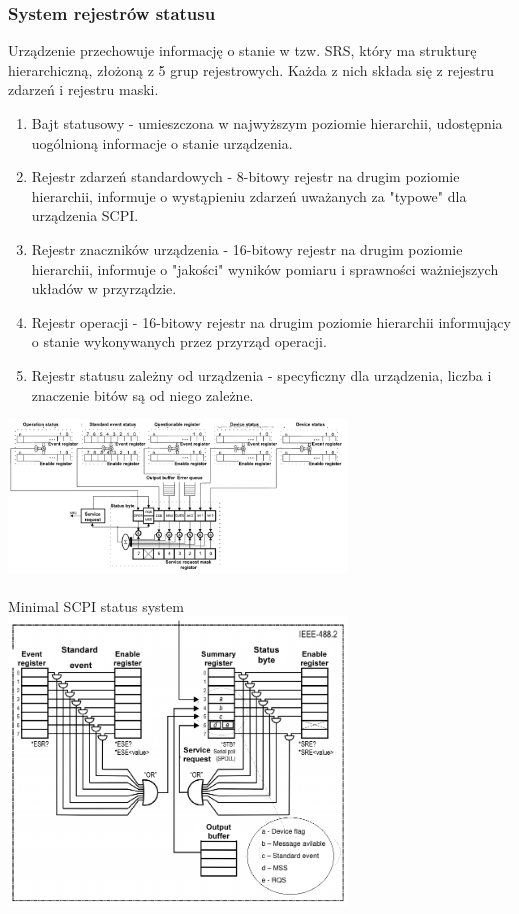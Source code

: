 \subsubsection{System rejestrów statusu}
Urządzenie przechowuje informację o stanie w tzw. SRS, który ma strukturę hierarchiczną, złożoną z 5 grup rejestrowych. Każda z nich składa się z rejestru zdarzeń i rejestru maski.
\begin{enumerate}
	\item Bajt statusowy - umieszczona w najwyższym poziomie hierarchii, udostępnia uogólnioną informacje o stanie urządzenia.
	\item Rejestr zdarzeń standardowych - 8-bitowy rejestr na drugim poziomie hierarchii, informuje o wystąpieniu zdarzeń uważanych za "typowe" dla urządzenia SCPI.
	\item Rejestr znaczników urządzenia - 16-bitowy rejestr na drugim poziomie hierarchii, informuje o "jakości" wyników pomiaru i sprawności ważniejszych układów w przyrządzie.
	\item Rejestr operacji - 16-bitowy rejestr na drugim poziomie hierarchii informujący o stanie wykonywanych przez przyrząd operacji.
	\item Rejestr statusu zależny od urządzenia - specyficzny dla urządzenia, liczba i znaczenie bitów są od niego zależne.
\end{enumerate}
\includegraphics[width=9cm]{./wyklady/IEEE488_SCPI_32_1.pdf}\\\\
Minimal SCPI status system\\
\includegraphics[width=9cm]{./wyklady/IEEE488_SCPI_33_1.pdf}

